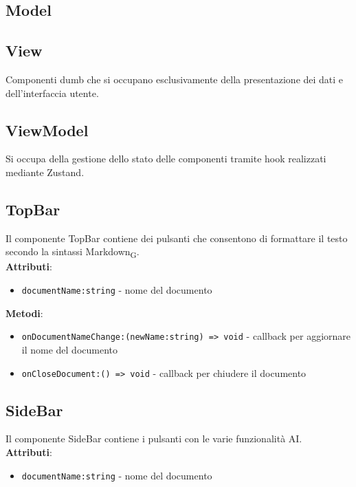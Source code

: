 \documentclass[11pt,a4paper]{article}
\newcommand{\gls}[1]{#1\textsubscript{G}}
\begin{document}
\subsection{Model}


\subsection{View}
Componenti dumb che si occupano esclusivamente della presentazione dei dati e dell'interfaccia utente.
\subsection{ViewModel}
Si occupa della gestione dello stato delle componenti tramite hook realizzati mediante Zustand.

\subsection{TopBar}
Il componente TopBar contiene dei pulsanti che consentono di formattare il testo secondo la sintassi \gls{Markdown}.\\

\textbf{Attributi}:
\begin{itemize}
    \item \texttt{documentName:string} - nome del documento
\end{itemize}

\textbf{Metodi}:
\begin{itemize}
    \item \texttt{onDocumentNameChange:(newName:string) => void} - callback per aggiornare il nome del documento
    \item \texttt{onCloseDocument:() => void} - callback per chiudere il documento
\end{itemize}

\subsection{SideBar}
Il componente SideBar contiene i pulsanti con le varie funzionalità AI.\\

\textbf{Attributi}:
\begin{itemize}
    \item \texttt{documentName:string} - nome del documento
\end{itemize}
\end{document}
